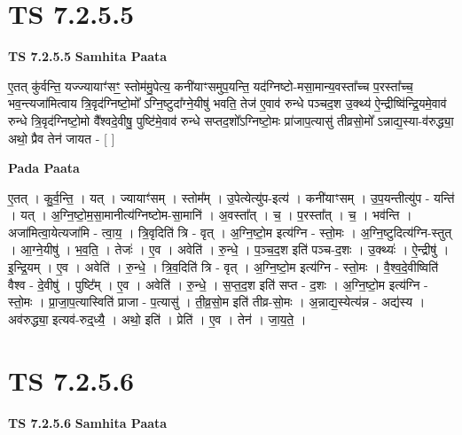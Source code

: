 \documentclass[17pt]{extarticle}
\begin{document}
\section*{ TS 7.2.5.5 }

\textbf{TS 7.2.5.5 } \newline
\textbf{Samhita Paata} \newline

ए॒तत् कु॑र्वन्ति॒ यज्ज्यायाꣳ॑सꣳ॒॒ स्तोम॑मु॒पेत्य॒ कनी॑याꣳसमुप॒यन्ति॒ यद॑ग्निष्टो-मसा॒मान्य॒वस्ता᳚च्च प॒रस्ता᳚च्च॒ भव॒न्त्यजा॑मित्वाय त्रि॒वृद॑ग्निष्टो॒मो᳚ ऽग्नि॒ष्टुदा᳚ग्ने॒यीषु॑ भवति॒ तेज॑ ए॒वाव॑ रुन्धे पञ्चद॒श उ॒क्थ्य॑ ऐ॒न्द्रीष्वि॑न्द्रि॒यमे॒वाव॑ रुन्धे त्रि॒वृद॑ग्निष्टो॒मो वै᳚श्वदे॒वीषु॒ पुष्टि॑मे॒वाव॑ रुन्धे सप्तद॒शो᳚ऽग्निष्टो॒मः प्रा॑जाप॒त्यासु॑ तीव्रसो॒मो᳚ ऽन्नाद्य॒स्या-व॑रुद्ध्या॒ अथो॒ प्रैव तेन॑ जायत - [  ] \newline

\textbf{Pada Paata} \newline

ए॒तत् । कु॒र्व॒न्ति॒ । यत् । ज्यायाꣳ॑सम् । स्तोम᳚म् । उ॒पेत्येत्यु॑प-इत्य॑ । कनी॑याꣳसम् । उ॒प॒यन्तीत्यु॑प - यन्ति॑ । यत् । अ॒ग्नि॒ष्टो॒म॒सा॒मानीत्य॑ग्निष्टोम-सा॒मानि॑ । अ॒वस्ता᳚त् । च॒ । प॒रस्ता᳚त् । च॒ । भव॑न्ति । अजा॑मित्वा॒येत्यजा॑मि - त्वा॒य॒ । त्रि॒वृदिति॑ त्रि - वृत् । अ॒ग्नि॒ष्टो॒म इत्य॑ग्नि - स्तो॒मः । अ॒ग्नि॒ष्टुदित्य॑ग्नि-स्तुत् । आ॒ग्ने॒यीषु॑ । भ॒व॒ति॒ । तेजः॑ । ए॒व । अवेति॑ । रु॒न्धे॒ । प॒ञ्च॒द॒श इति॑ पञ्च-द॒शः । उ॒क्थ्यः॑ । ऐ॒न्द्रीषु॑ । इ॒न्द्रि॒यम् । ए॒व । अवेति॑ । रु॒न्धे॒ । त्रि॒व॒दिति॑ त्रि - वृत् । अ॒ग्नि॒ष्टो॒म इत्य॑ग्नि - स्तो॒मः । वै॒श्व॒दे॒वीष्विति॑ वैश्व - दे॒वीषु॑ । पुष्टि᳚म् । ए॒व । अवेति॑ । रु॒न्धे॒ । स॒प्त॒द॒श इति॑ सप्त - द॒शः । अ॒ग्नि॒ष्टो॒म इत्य॑ग्नि - स्तो॒मः । प्रा॒जा॒प॒त्यास्विति॑ प्राजा - प॒त्यासु॑ । ती॒व्र॒सो॒म इति॑ तीव्र-सो॒मः । अ॒न्नाद्य॒स्येत्य॑न्न - अद्य॑स्य । अव॑रुद्ध्या॒ इत्यव॑-रुद्॒ध्यै॒ । अथो॒ इति॑ । प्रेति॑ । ए॒व । तेन॑ । जा॒य॒ते॒ ।  \newline




\section*{ TS 7.2.5.6 }

\textbf{TS 7.2.5.6 } \newline
\textbf{Samhita Paata} \newline
\end{document}
